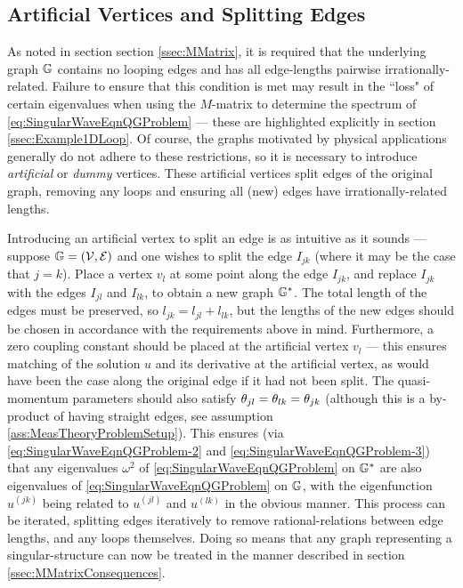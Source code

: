 \subsection{Artificial Vertices and Splitting Edges} \label{ssec:ArtificialVertices}
As noted in section section \ref{ssec:MMatrix}, it is required that the underlying graph $\mathbb{G}$ contains no looping edges and has all edge-lengths pairwise irrationally-related.
Failure to ensure that this condition is met may result in the ``loss" of certain eigenvalues when using the $M$-matrix to determine the spectrum of \eqref{eq:SingularWaveEqnQGProblem} --- these are highlighted explicitly in section \ref{ssec:Example1DLoop}.
Of course, the graphs motivated by physical applications generally do not adhere to these restrictions, so it is necessary to introduce \emph{artificial} or \emph{dummy} vertices.
These artificial vertices split edges of the original graph, removing any loops and ensuring all (new) edges have irrationally-related lengths.

Introducing an artificial vertex to split an edge is as intuitive as it sounds --- suppose $\mathbb{G}=\left( \mathcal{V}, \mathcal{E} \right)$ and one wishes to split the edge $I_{jk}$ (where it may be the case that $j=k$).
Place a vertex $v_l$ at some point along the edge $I_{jk}$, and replace $I_{jk}$ with the edges $I_{jl}$ and $I_{lk}$, to obtain a new graph $\mathbb{G}^*$.
The total length of the edges must be preserved, so $l_{jk} = l_{jl} + l_{lk}$, but the lengths of the new edges should be chosen in accordance with the requirements above in mind.
Furthermore, a zero coupling constant should be placed at the artificial vertex $v_l$ --- this ensures matching of the solution $u$ and its derivative at the artificial vertex, as would have been the case along the original edge if it had not been split.
The quasi-momentum parameters should also satisfy $\theta_{jl}=\theta_{lk}=\theta_{jk}$ (although this is a by-product of having straight edges, see assumption \ref{ass:MeasTheoryProblemSetup}).
This ensures (via \eqref{eq:SingularWaveEqnQGProblem-2} and \eqref{eq:SingularWaveEqnQGProblem-3}) that any eigenvalues $\omega^2$ of \eqref{eq:SingularWaveEqnQGProblem} on $\mathbb{G}^*$ are also eigenvalues of \eqref{eq:SingularWaveEqnQGProblem} on $\mathbb{G}$, with the eigenfunction $u^{(jk)}$ being related to $u^{(jl)}$ and $u^{(lk)}$ in the obvious manner.
This process can be iterated, splitting edges iteratively to remove rational-relations between edge lengths, and any loops themselves.
Doing so means that any graph representing a singular-structure can now be treated in the manner described in section \ref{ssec:MMatrixConsequences}.

